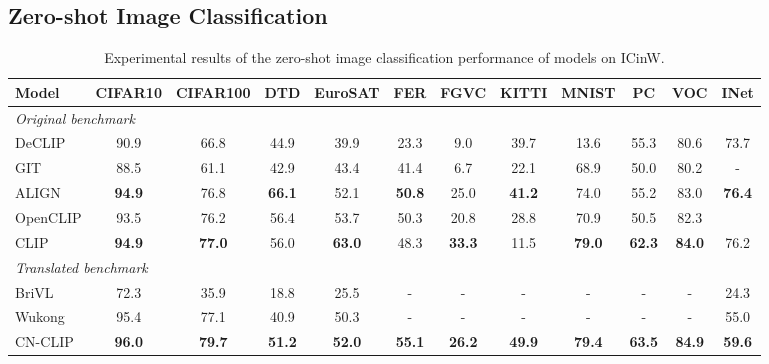 \documentclass[11pt]{article}
\begin{document}
\subsection{Zero-shot Image Classification}
\begin{table*}[t]
\center
\small
\vskip 0.15in
\begin{adjustbox}{max width=1.\textwidth}
\begin{tabular}{@{\extracolsep{\fill}}lccccccccccc}
\toprule
Model & CIFAR10 & CIFAR100 & DTD & EuroSAT & FER & FGVC & KITTI & MNIST & PC & VOC & INet\\
\midrule
    \multicolumn{8}{l}{\textit{Original benchmark}} \\
    DeCLIP  & 90.9 & 66.8 & 44.9 & 39.9 & 23.3 & 9.0 & 39.7 & 13.6 & 55.3  & 80.6 & 73.7\\
    GIT  & 88.5 & 61.1 & 42.9 & 43.4 & 41.4 & 6.7 & 22.1 & 68.9 & 50.0 & 80.2 & -\\
ALIGN & \textbf{94.9} & 76.8 & \textbf{66.1} & 52.1 & \textbf{50.8} & 25.0 & \textbf{41.2} & 74.0 & 55.2 & 83.0 & \textbf{76.4}\\
OpenCLIP  & 93.5 & 76.2 & 56.4 & 53.7 & 50.3 & 20.8 & 28.8 & 70.9 & 50.5 & 82.3 \\
    CLIP  & \textbf{94.9} & \textbf{77.0} & 56.0 & \textbf{63.0} & 48.3 & \textbf{33.3} & 11.5 &\textbf{79.0} & \textbf{62.3} & \textbf{84.0} & 76.2\\
\midrule
    \multicolumn{8}{l}{\textit{Translated benchmark}} \\
    BriVL  & 72.3 & 35.9 & 18.8 & 25.5 & - & - & - & - & -  & - & 24.3\\
    Wukong & 95.4 & 77.1 & 40.9 & 50.3 & - & - & - & - & -  & - & 55.0\\
    CN-CLIP & \textbf{96.0} & \textbf{79.7} & \textbf{51.2} & \textbf{52.0} & \textbf{55.1} & \textbf{26.2} & \textbf{49.9} & \textbf{79.4} & \textbf{63.5} & \textbf{84.9} & \textbf{59.6} \\
\bottomrule
\end{tabular}
\end{adjustbox}
\caption{Experimental results of the zero-shot image classification performance of models on ICinW. }
\label{tb:zs_v2}
\end{table*}

%
 
\end{document}
